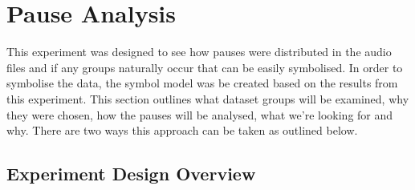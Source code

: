 
\section{Pause Analysis}
%
%
This experiment was designed to see how pauses were distributed in the audio files and if any groups naturally occur that can be easily symbolised. In order to symbolise the data, the symbol model was be created based on the results from this experiment. This section outlines what dataset groups will be examined, why they were chosen, how the pauses will be analysed, what we're looking for and why.  There are two ways this approach can be taken as outlined below. \\

\subsection{Experiment Design Overview}
